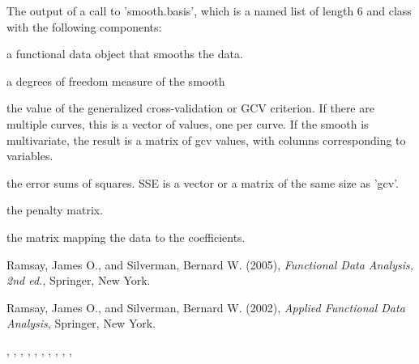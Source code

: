 \documentclass{article}
\begin{document}
\begin{Value}
The output of a call to 'smooth.basis', which is a named list of
length 6 and class  with the following components:  

\begin{ldescription}
\item[\code{fd}] a functional data object that smooths the data.

\item[\code{df}] a degrees of freedom measure of the smooth

\item[\code{gcv}] the value of the generalized cross-validation or GCV criterion.  If
there are multiple curves, this is a vector of values, one per
curve.  If the smooth is multivariate, the result is a matrix of gcv
values, with columns corresponding to variables.  

\item[\code{SSE}] the error sums of squares.  SSE is a vector or a matrix of the same
size as 'gcv'. 

\item[\code{penmat}] the penalty matrix.

\item[\code{y2cMap}] the matrix mapping the data to the coefficients.

\end{ldescription}
\end{Value}
\begin{References}\relax
Ramsay, James O., and Silverman, Bernard W. (2005), \emph{Functional 
Data Analysis, 2nd ed.}, Springer, New York. 

Ramsay, James O., and Silverman, Bernard W. (2002), \emph{Applied
Functional Data Analysis}, Springer, New York.
\end{References}
\begin{SeeAlso}\relax
{}, 
, 
, 
, 
, 
, 
, 
, 
, 
, 
\end{SeeAlso}
\end{document}

